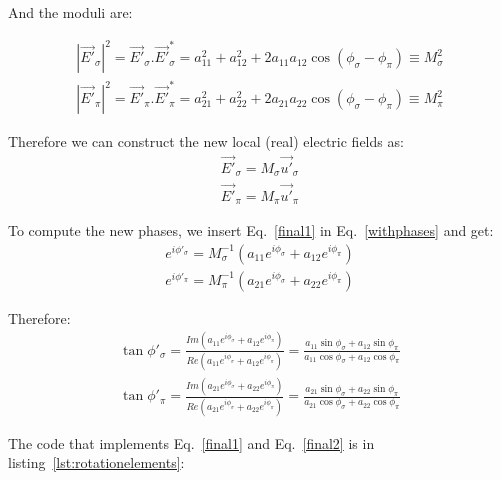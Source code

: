\documentclass{iucr}
\begin{document}
And the moduli are: 

\begin{eqnarray}
|\vec{E'}_\sigma|^2 = \vec{E'}_\sigma . \vec{E'}_\sigma^*  = 
a_{11}^2 + a_{12}^2 + 2 a_{11} a_{12} \cos(\phi_\sigma-\phi_\pi) \equiv
M_\sigma^2 \nonumber \\ 
|\vec{E'}_\pi|^2    = \vec{E'}_\pi    . \vec{E'}_\pi^*     = 
a_{21}^2 + a_{22}^2 + 2 a_{21} a_{22} \cos(\phi_\sigma-\phi_\pi) \equiv
M_\pi^2
\end{eqnarray}

Therefore we can construct the new local (real) electric fields as: 
\begin{eqnarray}
\label{final1}
\vec{E'}_\sigma = M_\sigma \vec{u'}_\sigma  \nonumber \\ 
\vec{E'}_\pi = M_\pi \vec{u'}_\pi  
\end{eqnarray}

To compute the new phases, we insert Eq.~\ref{final1} in Eq.~\ref{withphases} and get: 
\begin{eqnarray}
e^{i \phi'_\sigma} = M_\sigma^{-1} (a_{11} e^{i \phi_\sigma} + a_{12} e^{i \phi_\pi})  \nonumber \\ 
e^{i \phi'_\pi} =  M_\pi^{-1}      (a_{21} e^{i \phi_\sigma} + a_{22} e^{i \phi_\pi}) 
\end{eqnarray}

Therefore:
\begin{eqnarray}
\label{final2}
\tan{\phi'_\sigma} = \frac{Im(a_{11} e^{i \phi_\sigma} + a_{12} e^{i \phi_\pi})}
                          {Re(a_{11} e^{i \phi_\sigma} + a_{12} e^{i \phi_\pi})} = 
                          \frac{a_{11} \sin{\phi_\sigma} + a_{12} \sin{\phi_\pi}}
                               {a_{11} \cos{\phi_\sigma} + a_{12} \cos{\phi_\pi}}  \nonumber \\ 
\tan{\phi'_\pi} =  \frac{Im(a_{21} e^{i \phi_\sigma} + a_{22} e^{i \phi_\pi})}
                        {Re(a_{21} e^{i \phi_\sigma} + a_{22} e^{i \phi_\pi})} = 
                        \frac{a_{21} \sin{\phi_\sigma} + a_{22} \sin{\phi_\pi}}
                             {a_{21} \cos{\phi_\sigma} + a_{22} \cos{\phi_\pi}}
\end{eqnarray}


The code that implements Eq.~\ref{final1} and Eq.~\ref{final2} is in listing~\ref{lst:rotationelements}: 
\end{document}

